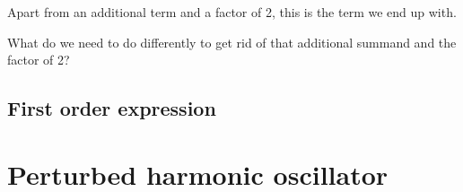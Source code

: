 \documentclass[11pt, english, fleqn, DIV=15, headinclude, BCOR=1.5cm]{scrartcl}
\begin{document}
Apart from an additional term and a factor of 2, this is the term we end up
with.

\begin{question}
    What do we need to do differently to get rid of that additional summand and
    the factor of 2?
\end{question}

\subsection{First order expression}

\section{Perturbed harmonic oscillator}
\end{document}
